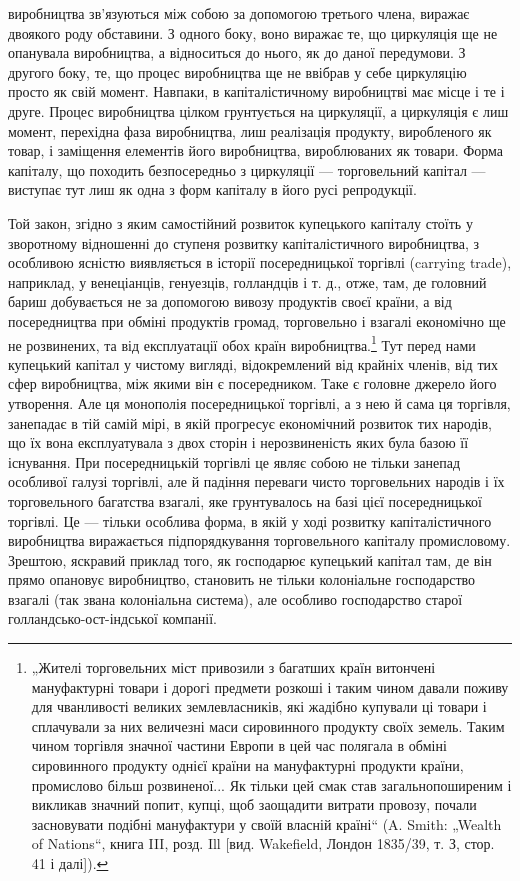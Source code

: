 виробництва зв’язуються між собою за допомогою третього члена,
виражає двоякого роду обставини. З одного боку, воно виражає
те, що циркуляція ще не опанувала виробництва, а відноситься до
нього, як до даної передумови. З другого боку, те, що процес
виробництва ще не ввібрав у себе циркуляцію просто як свій
момент. Навпаки, в капіталістичному виробництві має місце і те
і друге. Процес виробництва цілком грунтується на циркуляції, а
циркуляція є лиш момент, перехідна фаза виробництва, лиш реалізація
продукту, виробленого як товар, і заміщення елементів
його виробництва, вироблюваних як товари. Форма капіталу, що
походить безпосередньо з циркуляції — торговельний капітал —
виступає тут лиш як одна з форм капіталу в його русі репродукції.

Той закон, згідно з яким самостійний розвиток купецького капіталу
стоїть у зворотному відношенні до ступеня розвитку капіталістичного
виробництва, з особливою ясністю виявляється в історії
посередницької торгівлі (carrying trade), наприклад, у венеціанців,
генуезців, голландців і т. д., отже, там, де головний бариш
добувається не за допомогою вивозу продуктів своєї країни,
а від посередництва при обміні продуктів громад, торговельно
і взагалі економічно ще не розвинених, та від експлуатації обох
країн виробництва.\footnote{
„Жителі торговельних міст привозили з багатших країн витончені мануфактурні
товари і дорогі предмети розкоші і таким чином давали поживу для
чванливості великих землевласників, які жадібно купували ці товари і сплачували
за них величезні маси сировинного продукту своїх земель. Таким чином торгівля
значної частини Европи в цей час полягала в обміні сировинного продукту
однієї країни на мануфактурні продукти країни, промислово більш розвиненої...
Як тільки цей смак став загальнопоширеним і викликав значний попит, купці,
щоб заощадити витрати провозу, почали засновувати подібні мануфактури
у своїй власній країні“ (A. Smith: „Wealth of Nations“, книга III, розд. Ill [вид.
Wakefield, Лондон 1835/39, т. З, стор. 41 і далі]).
} Тут перед нами купецький капітал у чистому
вигляді, відокремлений від крайніх членів, від тих сфер
виробництва, між якими він є посередником. Таке є головне
джерело його утворення. Але ця монополія посередницької торгівлі,
а з нею й сама ця торгівля, занепадає в тій самій мірі,
в якій прогресує економічний розвиток тих народів, що їх вона
експлуатувала з двох сторін і нерозвиненість яких була базою
її існування. При посередницькій торгівлі це являє собою не
тільки занепад особливої галузі торгівлі, але й падіння переваги
чисто торговельних народів і їх торговельного багатства
взагалі, яке грунтувалось на базі цієї посередницької торгівлі.
Це — тільки особлива форма, в якій у ході розвитку капіталістичного
виробництва виражається підпорядкування торговельного
капіталу промисловому. Зрештою, яскравий приклад
того, як господарює купецький капітал там, де він прямо опановує
виробництво, становить не тільки колоніальне господарство
взагалі (так звана колоніальна система), але особливо господарство
старої голландсько-ост-індської компанії.